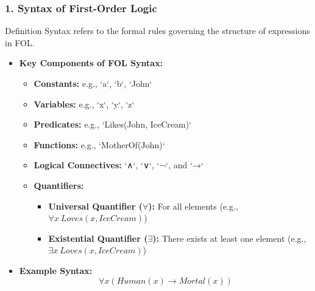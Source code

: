 \documentclass[aspectratio=169]{beamer}
\begin{document}
\begin{frame}[fragile]
    \frametitle{1. Syntax of First-Order Logic}
    \begin{block}{Definition}
        Syntax refers to the formal rules governing the structure of expressions in FOL.
    \end{block}
    \begin{itemize}
        \item \textbf{Key Components of FOL Syntax:}
            \begin{itemize}
                \item \textbf{Constants:} e.g., `a`, `b`, `John`
                \item \textbf{Variables:} e.g., `x`, `y`, `z`
                \item \textbf{Predicates:} e.g., `Likes(John, IceCream)`
                \item \textbf{Functions:} e.g., `MotherOf(John)`
                \item \textbf{Logical Connectives:} `∧`, `∨`, `¬`, and `→`
                \item \textbf{Quantifiers:}
                    \begin{itemize}
                        \item \textbf{Universal Quantifier ($\forall$):} For all elements (e.g., $\forall x\ Loves(x, IceCream)$)
                        \item \textbf{Existential Quantifier ($\exists$):} There exists at least one element (e.g., $\exists x\ Loves(x, IceCream)$)
                    \end{itemize}
            \end{itemize}
        \item \textbf{Example Syntax:}
            \begin{equation}
            \forall x (Human(x) \rightarrow Mortal(x))
            \end{equation}
    \end{itemize}
\end{frame}
\end{document}
